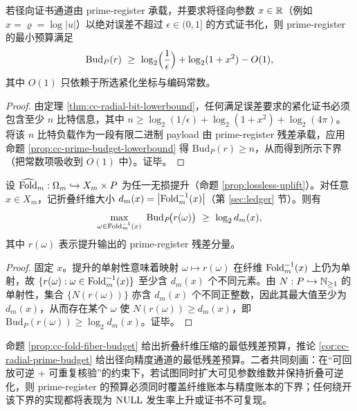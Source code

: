\begin{corollary}\label{cor:cc-radial-prime-budget}
若径向证书通道由 prime-register 承载，并要求将径向参数 $x\in\mathbb{R}$（例如 $x=\varrho=\log|u|$）以绝对误差不超过 $\epsilon\in(0,1]$ 的方式证书化，则 prime-register 的最小预算满足
$$
\mathrm{Bud}_P(r)\ \ge\ \log_2\Bigl(\frac{1}{\epsilon}\Bigr)+\log_2(1+x^2)-O(1),
$$
其中 $O(1)$ 只依赖于所选紧化坐标与编码常数。
\end{corollary}

\begin{proof}
由定理 \ref{thm:cc-radial-bit-lowerbound}，任何满足误差要求的紧化证书必须包含至少 $n$ 比特信息，其中 $n\ge \log_2(1/\epsilon)+\log_2(1+x^2)+\log_2(4\pi)$。将该 $n$ 比特负载作为一段有限二进制 payload 由 prime-register 残差承载，应用命题 \ref{prop:cc-prime-budget-lowerbound} 得 $\mathrm{Bud}_P(r)\ge n$，从而得到所示下界（把常数项吸收到 $O(1)$ 中）。证毕。
\end{proof}

\begin{proposition}[折叠纤维账本的残差预算下界]\label{prop:cc-fold-fiber-budget}
设 $\widehat{\mathrm{Fold}}_m:\Omega_m\hookrightarrow X_m\times P$ 为任一无损提升（命题 \ref{prop:lossless-uplift}）。对任意 $x\in X_m$，记折叠纤维大小 $d_m(x)=\left\lvert \mathrm{Fold}_m^{-1}(x)\right\rvert$（第 \ref{sec:ledger} 节）。则有
$$
\max_{\omega\in\Fold_m^{-1}(x)}\ \mathrm{Bud}_P\!\bigl(r(\omega)\bigr)\ \ge\ \log_2 d_m(x),
$$
其中 $r(\omega)$ 表示提升输出的 prime-register 残差分量。
\end{proposition}

\begin{proof}
固定 $x$。提升的单射性意味着映射 $\omega\mapsto r(\omega)$ 在纤维 $\mathrm{Fold}_m^{-1}(x)$ 上仍为单射，故 $\{r(\omega):\omega\in\mathrm{Fold}_m^{-1}(x)\}$ 至少含 $d_m(x)$ 个不同元素。由 $N:P\hookrightarrow\mathbb{N}_{\ge 1}$ 的单射性，集合 $\{N(r(\omega))\}$ 亦含 $d_m(x)$ 个不同正整数，因此其最大值至少为 $d_m(x)$，从而存在某个 $\omega$ 使 $N(r(\omega))\ge d_m(x)$，即 $\mathrm{Bud}_P(r(\omega))\ge \log_2 d_m(x)$。证毕。
\end{proof}

\begin{remark}[三账本下界的组合读法]\label{rem:cc-three-ledger}
命题 \ref{prop:cc-fold-fiber-budget} 给出折叠纤维压缩的最低残差预算，推论 \ref{cor:cc-radial-prime-budget} 给出径向精度通道的最低残差预算。二者共同刻画：在“可回放可逆 + 可重复核验”的约束下，若试图同时扩大可见参数维数并保持折叠可逆化，则 prime-register 的预算必须同时覆盖纤维账本与精度账本的下界；任何绕开该下界的实现都将表现为 $\mathrm{NULL}$ 发生率上升或证书不可复现。
\end{remark}


